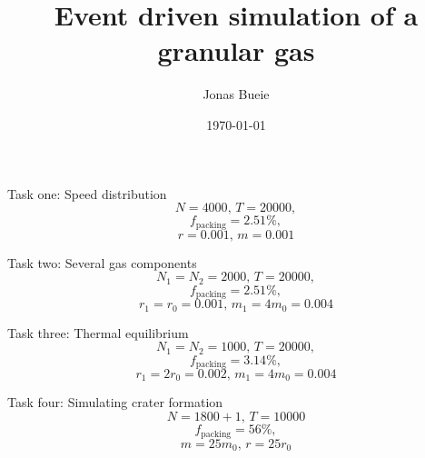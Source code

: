 \documentclass{beamer}
\title{Event driven simulation of a granular gas}
\author{Jonas Bueie}
\date{\today}
\begin{document}
\frame{\titlepage}

\begin{frame}
    \vfill
    \centering
    Task one: Speed distribution 
    \vfill
    \begin{equation*}
        N = 4000, \, T = 20000, 
    \end{equation*}
    \begin{equation*}
        f_\text{packing} = 2.51 \%,
    \end{equation*}
    \begin{equation*}
        r = 0.001, \, m = 0.001
    \end{equation*}
\end{frame}


\begin{frame}
    \vfill
    \centering
    Task two: Several gas components 
    \vfill
    \begin{equation*}
        N_1 = N_2 = 2000, \, T = 20000, 
    \end{equation*}
    \begin{equation*}
        f_\text{packing} = 2.51 \%,
    \end{equation*}
    \begin{equation*}
        r_1 = r_0 = 0.001, \, m_1 = 4m_0 = 0.004
    \end{equation*}
\end{frame}


\begin{frame}
    \vfill
    \centering
    Task three: Thermal equilibrium
    \vfill
    \begin{equation*}
        N_1 = N_2 = 1000, \, T = 20000, 
    \end{equation*}
    \begin{equation*}
        f_\text{packing} = 3.14 \%,
    \end{equation*}
    \begin{equation*}
        r_1 = 2r_0 = 0.002, \, m_1 = 4m_0 = 0.004
    \end{equation*}
\end{frame}


\begin{frame}
    \vfill
    \centering
    Task four: Simulating crater formation
    \vfill
    \begin{equation*}
        N = 1800 + 1, \, T = 10000
    \end{equation*}
    \begin{equation*}
        f_\text{packing} = 56 \%,
    \end{equation*}
    \begin{equation*}
        m = 25m_0, \, r = 25r_0
    \end{equation*}

\end{frame}


\end{document}
